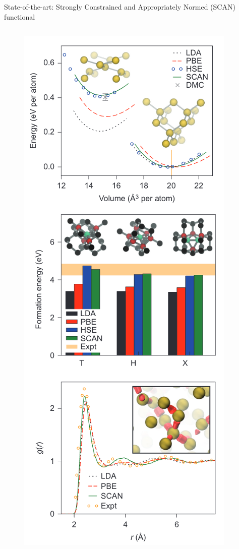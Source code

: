 \documentclass[aspectratio=169]{beamer}
\begin{document}
\begin{frame}{State-of-the-art: Strongly Constrained and Appropriately Normed (SCAN) functional}
\begin{columns}
            \begin{figure}
                \centering
                \includegraphics[width=0.8\linewidth]{lectures/figures/6_scan_performance_2.png}
            \end{figure}
        \end{columns}

    \end{frame}
\end{document}

